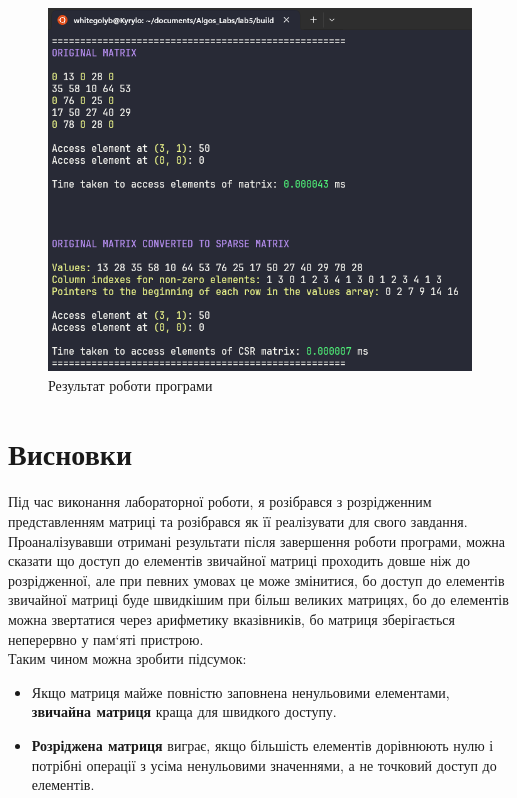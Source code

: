 \begin{figure}[h!]
    \centering
    \includegraphics[width=18cm]{reports/algos/lab5/assets/3.png}
    \caption{Результат роботи програми}
\end{figure}

\clearpage
\section{Висновки}
Під час виконання лабораторної роботи, я розібрався з 
розрідженним представленням матриці та розібрався як її
реалізувати для свого завдання. \\

    Проаналізувавши отримані результати після завершення роботи
програми, можна сказати що доступ до елементів звичайної матриці проходить довше ніж до розрідженної, але при певних умовах це може змінитися, бо доступ до елементів звичайної матриці буде швидкішим при більш великих матрицях, бо до елементів можна звертатися через арифметику вказівників, бо матриця зберігається неперервно у пам`яті пристрою. \\

Таким чином можна зробити підсумок:

\begin{itemize}
    \item Якщо матриця майже повністю заповнена ненульовими елементами, \textbf{звичайна матриця} краща для швидкого доступу.
    \item \textbf{Розріджена матриця} виграє, якщо більшість елементів дорівнюють нулю і потрібні операції з усіма ненульовими значеннями, а не точковий доступ до елементів.
\end{itemize}
